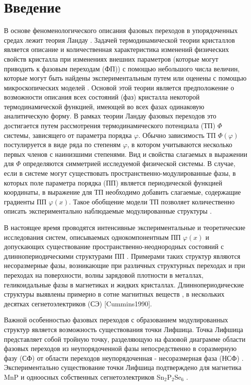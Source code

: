 
\chapter{Введение}\label{ch-intro}

В основе феноменологического описания фазовых переходов в упорядоченных средах лежит теория Ландау \cite{Landau1969, Toledano1994}.
Задачей термодинамической теории кристаллов является описание и количественная характеристика изменений физических свойств кристалла при изменениях внешних параметров (которые могут приводить к фазовым переходам (ФП)) с помощью небольшого числа величин, которые могут быть найдены экспериментальным путем или оценены с помощью микроскопических моделей \cite{Kholodenko1971}.
Основой этой теории является предположение о возможности описания всех состояний (фаз) кристалла некоторой термодинамической функцией, имеющей во всех фазах одинаковую аналитическую форму.
В рамках теории Ландау фазовых переходов это достигается путем рассмотрения термодинамического потенциала (ТП) $\Phi$ системы, зависящего от параметра порядка $\varphi$.
Обычно зависимость ТП  $\Phi(\varphi)$ постулируется в виде ряда по степеням $\varphi$, в котором учитываются несколько первых членов с наинизшими степенями.
Вид и свойства слагаемых в выражении для $\Phi$ определяются симметрией исследуемой физической системы.
В случае, если в системе могут существовать пространственно-модулированные фазы, в которых поле параметра порядка (ПП) является периодической функцией координаты, в выражение для ТП необходимо добавить слагаемые, содержащие градиенты ПП $\varphi(x)$.
Такое обобщение модели ТП позволяет количественно описать экспериментально наблюдаемые модулированные структуры \cite{Cimmins1990, Vysochanskii1994}.

В настоящее время проводятся интенсивные экспериментальные и теоретические исследования систем, описываемых однокомпонентным ПП $\varphi(x)$ и допускающих существование пространственно-неоднородных состояний с длиннопериодическими структурами ПП \cite{Toledano1994, Cimmins1990, Vysochanskii1992}.
Примерами таких структур являются несоразмерные фазы, возникающие при различных структурных переходах и при переходах на поверхности, волны зарядовой плотности в металлах, геликоидальные фазы в магнетиках и жидких кристаллах.
Длиннопериодические структуры выявлены примерно в сотне магнитных веществ \cite{Izjumov1987}, в нескольких десятках сегнетоэлектриков (СЭ) [Cummins1990].

Важной особенностью фазовых переходов с образованием модулированных структур является возможность существования точки Лифшица.
Точка Лифшица представляет собой тройную точку, разделяющую на фазовой диаграмме области фазовых переходов из неупорядоченной фазы непосредственно в соразмерную фазу (СФ) от области переходов неупорядоченная - несоразмерная фаза (НСФ) \cite{Cummins1990, Vysochanskii1992}.
Экспериментально существование точки Лифшица подтверждено для магнетика MnP и одноосных собственных сегнетоэлектриков Sn$_2$P$_2$Se$_6$ \cite{Vysochanskii1992}.
